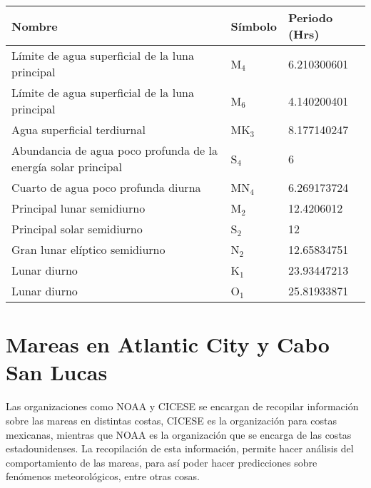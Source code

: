 \documentclass[12pt]{article}
\begin{document}
\begin{doublespace}
\begin{table}[H]
\begin{center}


\label{my-label}
\begin{tabular}{|l|l|l|}
\hline
Nombre                                                         &  Símbolo & Periodo (Hrs)  \\ \hline
Límite de agua superficial de la luna principal                &  M$_4$   &  6.210300601   \\ \hline
Límite de agua superficial de la luna principal                &  M$_6$   &  4.140200401   \\ \hline
Agua superficial terdiurnal                                    &  MK$_3$  &  8.177140247   \\ \hline
Abundancia de agua poco profunda de la energía solar principal &  S$_4$   &  6             \\ \hline
Cuarto de agua poco profunda diurna                            &  MN$_4$  &  6.269173724   \\ \hline
Principal lunar semidiurno                                     &  M$_2$   &  12.4206012    \\ \hline
Principal solar semidiurno                                     &  S$_2$   &  12            \\ \hline
Gran lunar elíptico semidiurno                                 &  N$_2$   &  12.65834751   \\ \hline
Lunar diurno                                                   &  K$_1$   &  23.93447213   \\ \hline
Lunar diurno                                                   &  O$_1$   &  25.81933871   \\ \hline
\end{tabular}
\end{center}
\end{table}

\section*{Mareas en Atlantic City y Cabo San Lucas}

Las organizaciones como NOAA y CICESE se encargan de recopilar información sobre las mareas en distintas costas, CICESE es la organización para costas mexicanas, mientras que NOAA es la organización que se encarga de las costas estadounidenses. La recopilación de esta información, permite hacer análisis del comportamiento de las mareas, para así poder hacer predicciones sobre fenómenos meteorológicos, entre otras cosas. 


\end{doublespace}
\end{document}
